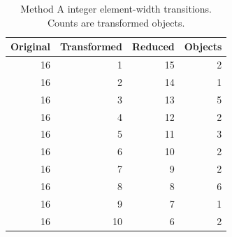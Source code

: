\begin{table}[t]
\centering
\caption{Method A integer element-width transitions. Counts are transformed objects.}
\label{tab:width-transitions}
\small
\begin{tabular}{rrrr}
\toprule
Original & Transformed & Reduced & Objects \\
\midrule
16 & 1 & 15 & 2 \\
16 & 2 & 14 & 1 \\
16 & 3 & 13 & 5 \\
16 & 4 & 12 & 2 \\
16 & 5 & 11 & 3 \\
16 & 6 & 10 & 2 \\
16 & 7 & 9 & 2 \\
16 & 8 & 8 & 6 \\
16 & 9 & 7 & 1 \\
16 & 10 & 6 & 2 \\
\bottomrule
\end{tabular}
\end{table}
